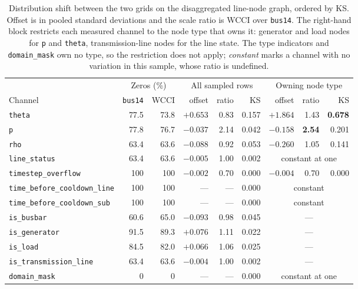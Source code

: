 \begin{table}[H]
  \centering
  \small
  \caption{Distribution shift between the two grids on the disaggregated
  line-node graph, ordered by KS. Offset is in pooled standard deviations and
  the scale ratio is WCCI over \texttt{bus14}. The right-hand block restricts
  each measured channel to the node type that owns it: generator and load nodes
  for \texttt{p} and \texttt{theta}, transmission-line nodes for the line state.
  {\color{clarif}The type indicators and \texttt{domain\_mask} own no type, so
  the restriction does not apply; \emph{constant} marks a channel with no
  variation in this sample, whose ratio is undefined.}}
  \label{tab:wcci-shift}
  \setlength{\tabcolsep}{4pt}
  \begin{tabular}{lrrrrrrrr}
    \toprule
    & \multicolumn{2}{c}{Zeros (\%)} & \multicolumn{3}{c}{All sampled rows}
    & \multicolumn{3}{c}{Owning node type} \\
    \cmidrule(lr){2-3}\cmidrule(lr){4-6}\cmidrule(lr){7-9}
    Channel & \texttt{bus14} & WCCI & offset & ratio & KS & offset & ratio & KS \\
    \midrule
    \texttt{theta}  & 77.5 & 73.8 & $+0.653$ & 0.83 & 0.157 & $+1.864$ & 1.43 & \textbf{0.678} \\
    \texttt{p}      & 77.8 & 76.7 & $-0.037$ & 2.14 & 0.042 & $-0.158$ & \textbf{2.54} & 0.201 \\
    \texttt{rho}    & 63.4 & 63.6 & $-0.088$ & 0.92 & 0.053 & $-0.260$ & 1.05 & 0.141 \\
    \texttt{line\_status} & 63.4 & 63.6 & $-0.005$ & 1.00 & 0.002 & \multicolumn{3}{c}{constant at one} \\
    \texttt{timestep\_overflow} & 100 & 100 & $-0.002$ & 0.70 & 0.000 & $-0.004$ & 0.70 & 0.000 \\
    \texttt{time\_before\_cooldown\_line} & 100 & 100 & --- & --- & 0.000 & \multicolumn{3}{c}{constant} \\
    \texttt{time\_before\_cooldown\_sub}  & 100 & 100 & --- & --- & 0.000 & \multicolumn{3}{c}{constant} \\
    \midrule
    \texttt{is\_busbar}   & 60.6 & 65.0 & $-0.093$ & 0.98 & 0.045 & \multicolumn{3}{c}{---} \\
    \texttt{is\_generator} & 91.5 & 89.3 & $+0.076$ & 1.11 & 0.022 & \multicolumn{3}{c}{---} \\
    \texttt{is\_load}      & 84.5 & 82.0 & $+0.066$ & 1.06 & 0.025 & \multicolumn{3}{c}{---} \\
    \texttt{is\_transmission\_line} & 63.4 & 63.6 & $-0.004$ & 1.00 & 0.002 & \multicolumn{3}{c}{---} \\
    \texttt{domain\_mask}  & 0 & 0 & --- & --- & 0.000 & \multicolumn{3}{c}{constant at one} \\
    \bottomrule
  \end{tabular}
\end{table}

